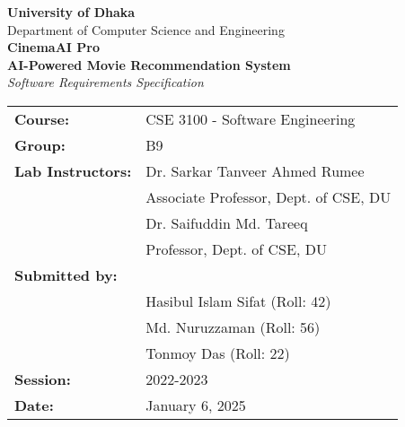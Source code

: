 \documentclass[12pt,a4paper]{article}
\begin{document}
\begin{titlepage}
    \centering
    \vspace*{1cm}
    
    {\LARGE\textbf{University of Dhaka}}\\[0.5cm]
    {\Large Department of Computer Science and Engineering}\\[2cm]
    
    {\Huge\textbf{CinemaAI Pro}}\\[0.5cm]
    {\Large\textbf{AI-Powered Movie Recommendation System}}\\[0.5cm]
    {\large\textit{Software Requirements Specification}}\\[3cm]
    
    \begin{minipage}{0.8\textwidth}
        \centering
        \begin{tabular}{ll}
            \textbf{Course:} & CSE 3100 - Software Engineering \\[0.3cm]
            \textbf{Group:} & B9 \\[0.3cm]
            \textbf{Lab Instructors:} & Dr. Sarkar Tanveer Ahmed Rumee \\
            & Associate Professor, Dept. of CSE, DU \\
            & Dr. Saifuddin Md. Tareeq \\
            & Professor, Dept. of CSE, DU \\[0.5cm]
            \textbf{Submitted by:} & \\
            & Hasibul Islam Sifat (Roll: 42) \\
            & Md. Nuruzzaman (Roll: 56) \\
            & Tonmoy Das (Roll: 22) \\[0.5cm]
            \textbf{Session:} & 2022-2023 \\[0.2cm]
            \textbf{Date:} & January 6, 2025 \\
        \end{tabular}
    \end{minipage}
    
    \vfill
\end{titlepage}

\tableofcontents
\newpage
\end{document}

